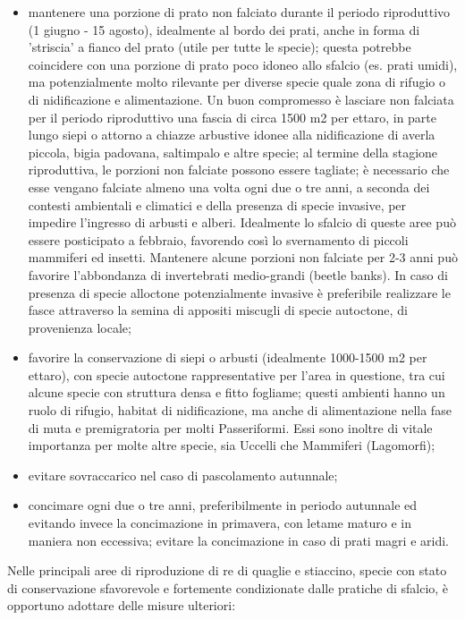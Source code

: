 \documentclass[10pt,twoside,openany,x11names,svgnames,italian,a5paper,dvipsnames,table]{memoir}
\begin{document}
\begin{itemize}\itemsep0pt
  \item mantenere una porzione di prato non falciato durante il periodo riproduttivo (1 giugno - 15 agosto), idealmente al bordo dei prati, anche in forma di ’striscia’ a fianco del prato (utile per tutte le specie); questa potrebbe coincidere con una porzione di prato poco idoneo allo sfalcio (es. prati umidi), ma potenzialmente molto rilevante per diverse specie quale zona di rifugio o di nidificazione e alimentazione. Un buon compromesso è lasciare non falciata per il periodo riproduttivo una fascia di circa 1500 m2 per ettaro, in parte lungo siepi o attorno a chiazze arbustive idonee alla nidificazione di averla piccola, bigia padovana, saltimpalo e altre specie; al termine della stagione riproduttiva, le porzioni non falciate possono essere tagliate; è necessario che esse vengano falciate almeno una volta ogni due o tre anni, a seconda dei contesti ambientali e climatici e della presenza di specie invasive, per impedire l’ingresso di arbusti e alberi. Idealmente lo sfalcio di queste aree può essere posticipato a febbraio, favorendo così lo svernamento di piccoli mammiferi ed insetti. Mantenere alcune porzioni non falciate per 2-3 anni può favorire l’abbondanza di invertebrati medio-grandi (beetle banks). In caso di presenza di specie alloctone potenzialmente invasive è preferibile realizzare le fasce attraverso la semina di appositi miscugli di specie autoctone, di provenienza locale;
  \item favorire la conservazione di siepi o arbusti (idealmente 1000-1500 m2 per ettaro), con specie autoctone rappresentative per l’area in questione, tra cui alcune specie con struttura densa e fitto fogliame; questi ambienti hanno un ruolo di rifugio, habitat di nidificazione, ma anche di alimentazione nella fase di muta e premigratoria per molti Passeriformi. Essi sono inoltre di vitale importanza per molte altre specie, sia Uccelli che Mammiferi (Lagomorfi);
  \item evitare sovraccarico nel caso di pascolamento autunnale;
  \item concimare ogni due o tre anni, preferibilmente in periodo autunnale ed evitando invece la concimazione in primavera, con letame maturo e in maniera non eccessiva; evitare la concimazione in caso di prati magri e aridi.
\end{itemize}
Nelle principali aree di riproduzione di re di quaglie e stiaccino, specie con stato di conservazione sfavorevole e fortemente condizionate dalle pratiche di sfalcio, è opportuno adottare delle misure ulteriori:
\end{document}
